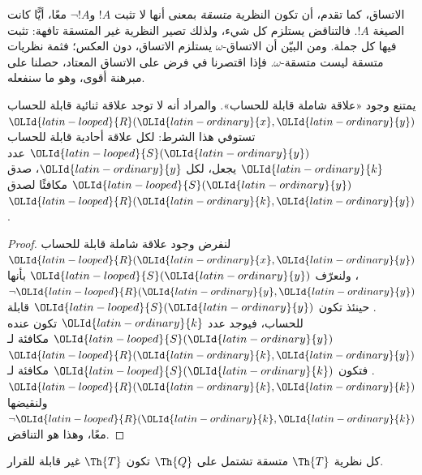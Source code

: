 \documentclass[../../../include/open-logic-section]{subfiles}
\begin{document}


\begin{explain}
الاتساق، كما تقدم، أن تكون النظرية \emph{متسقة} بمعنى أنها لا تثبت
$!A$ و$\lnot !A$ معًا، أيًّا كانت الصيغة $!A$. فالتناقض يستلزم كل
شيء، ولذلك تصير النظرية غير المتسقة تافهة: تثبت فيها كل جملة.
ومن البيّن أن الاتساق-$\omega$ يستلزم الاتساق، دون العكس؛ فثمة
نظريات متسقة ليست متسقة-$\omega$. فإذا اقتصرنا في فرض
 على الاتساق المعتاد، حصلنا على مبرهنة
أقوى، وهو ما سنفعله.
\end{explain}

\begin{lem}
يمتنع وجود «علاقة شاملة قابلة للحساب». والمراد أنه لا توجد علاقة
ثنائية قابلة للحساب $\OLId{latin-looped}{R}(\OLId{latin-ordinary}{x},\OLId{latin-ordinary}{y})$ تستوفي هذا الشرط: لكل علاقة أحادية
قابلة للحساب $\OLId{latin-looped}{S}(\OLId{latin-ordinary}{y})$ عدد $\OLId{latin-ordinary}{k}$ يجعل، لكل $\OLId{latin-ordinary}{y}$، صدق $\OLId{latin-looped}{S}(\OLId{latin-ordinary}{y})$ مكافئًا لصدق
$\OLId{latin-looped}{R}(\OLId{latin-ordinary}{k},\OLId{latin-ordinary}{y})$.
\end{lem}

\begin{proof}
لنفرض وجود علاقة شاملة قابلة للحساب $\OLId{latin-looped}{R}(\OLId{latin-ordinary}{x},\OLId{latin-ordinary}{y})$، ولنعرّف $\OLId{latin-looped}{S}(\OLId{latin-ordinary}{y})$ بأنها
$\lnot \OLId{latin-looped}{R}(\OLId{latin-ordinary}{y},\OLId{latin-ordinary}{y})$. حينئذ تكون $\OLId{latin-looped}{S}(\OLId{latin-ordinary}{y})$ قابلة للحساب، فيوجد عدد $\OLId{latin-ordinary}{k}$ تكون
عنده $\OLId{latin-looped}{S}(\OLId{latin-ordinary}{y})$ مكافئة لـ$\OLId{latin-looped}{R}(\OLId{latin-ordinary}{k},\OLId{latin-ordinary}{y})$. فتكون $\OLId{latin-looped}{S}(\OLId{latin-ordinary}{k})$ مكافئة لـ$\OLId{latin-looped}{R}(\OLId{latin-ordinary}{k},\OLId{latin-ordinary}{k})$
ولنقيضها $\lnot \OLId{latin-looped}{R}(\OLId{latin-ordinary}{k},\OLId{latin-ordinary}{k})$ معًا، وهذا هو التناقض.
\end{proof}


\begin{thm}
كل نظرية $\Th{T}$ متسقة تشتمل على $\Th{Q}$ تكون
$\Th{T}$ غير قابلة للقرار.
\end{thm}
\end{document}
